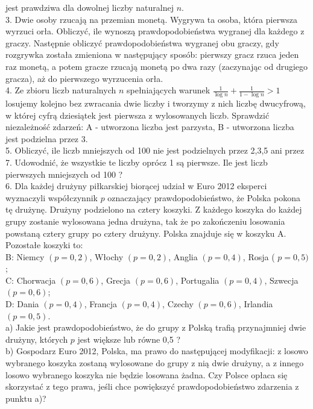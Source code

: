 \documentclass[10pt]{article}
\begin{document}
jest prawdziwa dla dowolnej liczby naturalnej $n$.\\
3. Dwie osoby rzucają na przemian monetą. Wygrywa ta osoba, która pierwsza wyrzuci orła. Obliczyć, ile wynoszą prawdopodobieństwa wygranej dla każdego z graczy. Następnie obliczyć prawdopodobieństwa wygranej obu graczy, gdy rozgrywka została zmieniona w następujący sposób: pierwszy gracz rzuca jeden raz monetą, a potem gracze rzucają monetą po dwa razy (zaczynając od drugiego gracza), aż do pierwszego wyrzucenia orła.\\
4. Ze zbioru liczb naturalnych $n$ spełniających warunek $\frac{1}{\log n}+\frac{1}{1-\log n}>1$ losujemy kolejno bez zwracania dwie liczby i tworzymy z nich liczbę dwucyfrową, w której cyfrą dziesiątek jest pierwsza z wylosowanych liczb. Sprawdzić niezależność zdarzeń: A - utworzona liczba jest parzysta, B - utworzona liczba jest podzielna przez 3.\\
5. Obliczyć, ile liczb mniejszych od 100 nie jest podzielnych przez 2,3,5 ani przez 7. Udowodnić, że wszystkie te liczby oprócz 1 są pierwsze. Ile jest liczb pierwszych mniejszych od 100 ?\\
6. Dla każdej drużyny piłkarskiej biorącej udział w Euro 2012 eksperci wyznaczyli współczynnik $p$ oznaczający prawdopodobieństwo, że Polska pokona tę drużynę. Drużyny podzielono na cztery koszyki. Z każdego koszyka do każdej grupy zostanie wylosowana jedna drużyna, tak że po zakończeniu losowania powstaną cztery grupy po cztery drużyny. Polska znajduje się w koszyku A. Pozostałe koszyki to:\\
B: Niemcy $(p=0,2)$, Włochy $(p=0,2)$, Anglia $(p=0,4)$, Rosja ( $p=0,5)$;\\
C: Chorwacja $(p=0,6)$, Grecja $(p=0,6)$, Portugalia $(p=0,4)$, Szwecja $(p=0,6)$;\\
D: Dania $(p=0,4)$, Francja $(p=0,4)$, Czechy $(p=0,6)$, Irlandia $(p=0,5)$.\\
a) Jakie jest prawdopodobieństwo, że do grupy z Polską trafią przynajmniej dwie drużyny, których $p$ jest większe lub równe 0,5 ?\\
b) Gospodarz Euro 2012, Polska, ma prawo do następującej modyfikacji: z losowo wybranego koszyka zostaną wylosowane do grupy z nią dwie drużyny, a z innego losowo wybranego koszyka nie będzie losowana żadna. Czy Polsce opłaca się skorzystać z tego prawa, jeśli chce powiększyć prawdopodobieństwo zdarzenia z punktu a)?
\end{document}
